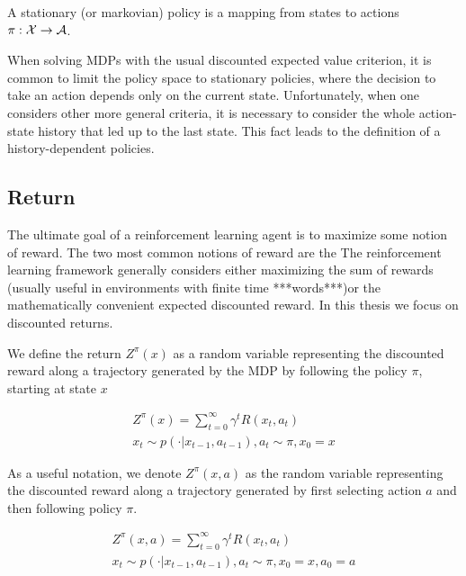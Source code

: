 \begin{definition}
A stationary (or markovian) policy is a mapping from states to actions $\pi:\mathcal{X} \to \mathcal{A}$.
\end{definition}

When solving MDPs with the usual discounted expected value criterion, it is common to limit the policy space to stationary policies, where the decision to take an action depends only on the current state. Unfortunately, when one considers other more general criteria, it is necessary to consider the whole action-state history that led up to the last state. This fact leads to the definition of a history-dependent policies.

\subsection{Return}

The ultimate goal of a reinforcement learning agent is to maximize some notion of reward. The two most common notions of reward are the 
The reinforcement learning framework generally considers either maximizing the sum of rewards (usually useful in environments with finite time ***words***)or the mathematically convenient expected discounted reward. In this thesis we focus on discounted returns.



We define the return $Z^\pi(x)$ as a random variable representing the discounted reward along a trajectory generated by the MDP by following the policy $\pi$, starting at state $x$

\begin{equation}\label{eqn:prelim:return}
\begin{split}
Z^\pi(x)=\sum_{t=0}^\infty \gamma^tR(x_t,a_t)\\
x_t \sim p(\cdot|x_{t-1}, a_{t-1}), a_t \sim \pi, x_0 = x
\end{split}
\end{equation}

As a useful notation, we denote $Z^\pi(x, a)$ as the random variable representing the discounted reward along a trajectory generated by first selecting action $a$ and then following policy $\pi$.

\begin{equation}
\begin{split}
Z^\pi(x, a)=\sum_{t=0}^\infty \gamma^tR(x_t,a_t)\\
x_t \sim p(\cdot|x_{t-1}, a_{t-1}), a_t \sim \pi, x_0 = x, a_0 = a
\end{split}
\end{equation}

